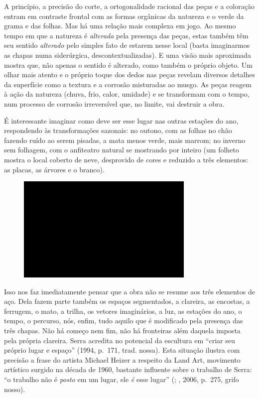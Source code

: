 A princípio, a precisão do corte, a ortogonalidade racional das peças e
a coloração entram em contraste frontal com as formas orgânicas da
natureza e o verde da grama e das folhas. Mas há uma relação mais
complexa em jogo. Ao mesmo tempo em que a natureza é \emph{alterada}
pela presença das peças, estas também têm seu sentido \emph{alterado}
pelo simples fato de estarem nesse local (basta imaginarmos as chapas
numa siderúrgica, descontextualizadas). E uma visão mais aproximada
mostra que, não apenas o sentido é alterado, como também o próprio
objeto. Um olhar mais atento e o próprio toque dos dedos nas peças
revelam diversos detalhes da superfície como a textura e a corrosão
misturadas ao musgo. As peças reagem à ação da natureza (chuva, frio,
calor, umidade) e se transformam com o tempo, num processo de corrosão
irreversível que, no limite, vai destruir a obra.

É interessante imaginar como deve ser esse lugar nas outras estações do
ano, respondendo às transformações sazonais: no outono, com as folhas no
chão fazendo ruído ao serem pisadas, a mata menos verde, mais marrom; no
inverno sem folhagem, com o anfiteatro natural se mostrando por inteiro
(um folheto mostra o local coberto de neve, desprovido de cores e
reduzido a três elementos: as placas, as árvores e o branco).

\begin{figure}[!ht]
\centering
 \includegraphics[width=85mm]{./imgs/im1.jpg}
\caption{\tiny{}}
\end{figure}

Isso nos faz imediatamente pensar que a obra não se resume aos três
elementos de aço. Dela fazem parte também os espaços segmentados, a
clareira, as encostas, a ferrugem, o mato, a trilha, os vetores
imaginários, a luz, as estações do ano, o tempo, o percurso, nós, enfim,
tudo aquilo que é modificado pela presença das três chapas. Não há
começo nem fim, não há fronteiras além daquela imposta pela própria
clareira. Serra acredita no potencial da escultura em ``criar seu
próprio lugar e espaço'' (1994, p.~171, trad. nossa). Esta situação
ilustra com precisão a frase do artista Michael Heizer a respeito da
Land Art, movimento artístico surgido na década de 1960, bastante
influente sobre o trabalho de Serra: ``o trabalho não é \emph{posto} em
um lugar, ele \emph{é} esse lugar'' (; , 2006, p.~275,
grifo nosso).

